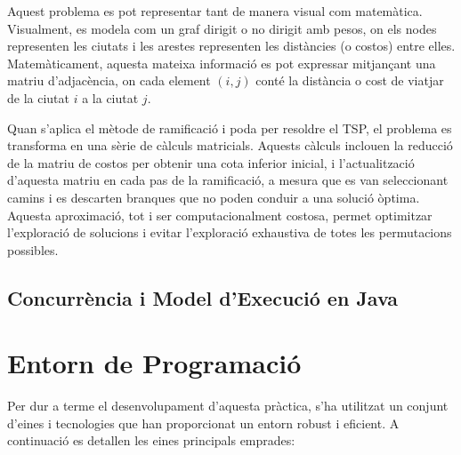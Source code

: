 \documentclass{ieeetj}
\begin{document}
Aquest problema es pot representar tant de manera visual com matemàtica. Visualment, es modela com un graf dirigit o no dirigit amb pesos, on els nodes representen les ciutats i les arestes representen les distàncies (o costos) entre elles. Matemàticament, aquesta mateixa informació es pot expressar mitjançant una matriu d’adjacència, on cada element $(i,j)$ conté la distància o cost de viatjar de la ciutat $i$ a la ciutat $j$. \newline

Quan s’aplica el mètode de ramificació i poda per resoldre el TSP, el problema es transforma en una sèrie de càlculs matricials. Aquests càlculs inclouen la reducció de la matriu de costos per obtenir una cota inferior inicial, i l'actualització d’aquesta matriu en cada pas de la ramificació, a mesura que es van seleccionant camins i es descarten branques que no poden conduir a una solució òptima. Aquesta aproximació, tot i ser computacionalment costosa, permet optimitzar l’exploració de solucions i evitar l’exploració exhaustiva de totes les permutacions possibles.



\subsection{Concurrència i Model d’Execució en Java}


\section{Entorn de Programació}

Per dur a terme el desenvolupament d’aquesta pràctica, s’ha utilitzat un conjunt d’eines i tecnologies que han proporcionat un entorn robust i eficient. A continuació es detallen les eines principals emprades:
\end{document}
